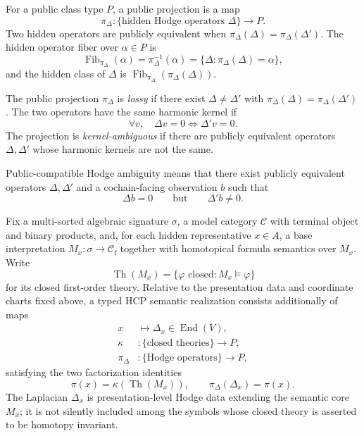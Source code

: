 \begin{definition}\label{def:hidden-operator-public-projection}
  For a public class type \(P\), a public projection is a map
  \[
    \pi_\Delta:\{\text{hidden Hodge operators }\Delta\}\longrightarrow P.
  \]
  Two hidden operators are publicly equivalent when
  \(\pi_\Delta(\Delta)=\pi_\Delta(\Delta')\). The hidden operator fiber over
  \(\alpha\in P\) is
  \[
    \operatorname{Fib}_{\pi_\Delta}(\alpha)
    =\pi_\Delta^{-1}(\alpha)
    =\{\Delta:\pi_\Delta(\Delta)=\alpha\},
  \]
  and the hidden class of \(\Delta\) is
  \(\operatorname{Fib}_{\pi_\Delta}(\pi_\Delta(\Delta))\).
\end{definition}

\begin{definition}\label{def:kernel-ambiguity}
  The public projection \(\pi_\Delta\) is \emph{lossy} if there exist
  \(\Delta\ne\Delta'\) with
  \(\pi_\Delta(\Delta)=\pi_\Delta(\Delta')\). The two
  operators have the same harmonic kernel if
  \[
    \forall v,\quad \Delta v=0\Longleftrightarrow \Delta'v=0.
  \]
  The projection is \emph{kernel-ambiguous} if there are publicly equivalent
  operators \(\Delta,\Delta'\) whose harmonic kernels are not the same.
\end{definition}

\begin{definition}\label{def:public-compatible-hodge-ambiguity}
  Public-compatible Hodge ambiguity means that there exist publicly equivalent
  operators \(\Delta,\Delta'\) and a cochain-facing observation \(b\) such that
  \[
    \Delta b=0
    \qquad\text{but}\qquad
    \Delta'b\ne 0.
  \]
\end{definition}

\begin{definition}\label{def:typed-hcp-realization}
  Fix a multi-sorted algebraic signature \(\sigma\), a model category
  \(\mathcal C\) with terminal object and binary products, and, for each
  hidden representative \(x\in A\), a base
  interpretation \(M_x:\sigma\to\mathcal C_{\mathrm f}\) together with
  homotopical formula semantics over \(M_x\). Write
  \[
    \operatorname{Th}(M_x)
    =\{\varphi\text{ closed}:M_x\vDash\varphi\}
  \]
  for its closed first-order theory. Relative to the presentation data and
  coordinate charts fixed above, a typed HCP semantic realization consists
  additionally of maps
  \[
  \begin{aligned}
    x&\longmapsto\Delta_x\in\operatorname{End}(V),\\
    \kappa&:\{\text{closed theories}\}\longrightarrow P,\\
    \pi_\Delta&:\{\text{Hodge operators}\}\longrightarrow P,
  \end{aligned}
  \]
  satisfying the two factorization identities
  \[
    \pi(x)=\kappa(\operatorname{Th}(M_x)),
    \qquad
    \pi_\Delta(\Delta_x)=\pi(x).
  \]
  The Laplacian \(\Delta_x\) is presentation-level Hodge data extending the
  semantic core \(M_x\); it is not silently included among the symbols whose
  closed theory is asserted to be homotopy invariant.
\end{definition}

